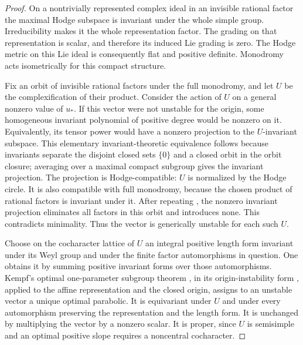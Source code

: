 \begin{proof}
On a nontrivially represented complex ideal in an invisible rational
factor the maximal Hodge subspace is invariant under the whole
simple group.  Irreducibility makes it the whole representation
factor.  The grading on that representation is scalar, and
therefore its induced Lie grading is zero.  The Hodge metric on
this Lie ideal is consequently flat and positive definite.
Monodromy acts isometrically for this compact structure.

Fix an orbit of invisible rational factors under the full
monodromy, and let $U$ be the complexification of their product.
Consider the action of $U$ on a general nonzero value of $u_*$.
If this vector were not unstable for the origin, some homogeneous
invariant polynomial of positive degree would be nonzero on it.
Equivalently, its tensor power would have a nonzero projection to
the $U$-invariant subspace.  This elementary invariant-theoretic
equivalence follows because invariants separate the disjoint
closed sets $\{0\}$ and a closed orbit in the orbit closure;
averaging over a maximal compact subgroup gives the invariant
projection.  The projection is Hodge-compatible: $U$ is normalized
by the Hodge circle.  It is also compatible with full monodromy,
because the chosen product of rational factors is invariant under
it.  After repeating , the nonzero
invariant projection eliminates all factors in this orbit and
introduces none.  This contradicts minimality.  Thus the vector
is generically unstable for each such $U$.

Choose on the cocharacter lattice of $U$ an integral positive
length form invariant under its Weyl group and under the finite
factor automorphisms in question.  One obtains it by summing
positive invariant forms over those automorphisms.  Kempf's
optimal one-parameter subgroup theorem
\cite[\S3]{Kempf78}, in its origin-instability form
\cite[Theorem~6]{Kempf76}, applied to the affine representation
and the closed origin, assigns to an unstable vector a unique
optimal parabolic.  It is equivariant under $U$ and under every
automorphism preserving the representation and the length form.
It is unchanged by multiplying the vector by a nonzero scalar.
It is proper, since $U$ is semisimple and an optimal positive
slope requires a noncentral cocharacter.


\end{proof}
